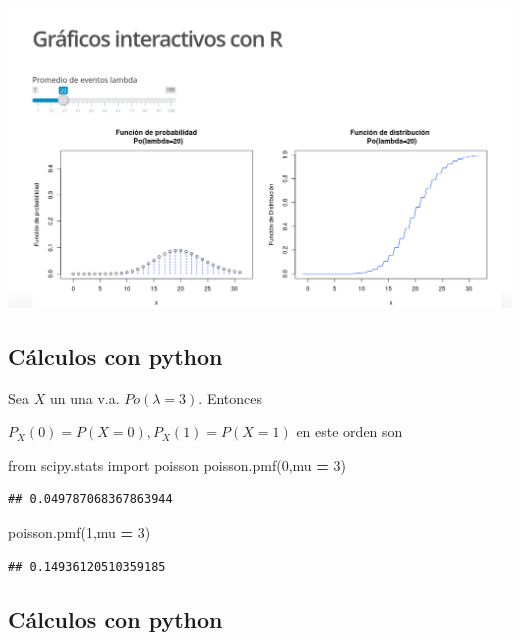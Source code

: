 \documentclass[]{book}
\newenvironment{Shaded}{\begin{snugshade}}{\end{snugshade}}
\newcommand{\DecValTok}[1]{\textcolor[rgb]{0.00,0.00,0.81}{#1}}
\newcommand{\ImportTok}[1]{#1}
\newcommand{\NormalTok}[1]{#1}
\newcommand{\OperatorTok}[1]{\textcolor[rgb]{0.81,0.36,0.00}{\textbf{#1}}}
\begin{document}
\href{https://joanby.shinyapps.io/DistribucionesNotables/}{\includegraphics{Images/noshinyImages/interactiva_poisson2.png}}

\hypertarget{cuxe1lculos-con-python-6}{%
\subsection{Cálculos con python}\label{cuxe1lculos-con-python-6}}

Sea \(X\) un una v.a. \(Po(\lambda=3)\). Entonces

\(P_X(0)=P(X=0), P_X(1)=P(X=1)\) en este orden son

\begin{Shaded}
\begin{Highlighting}[]
\ImportTok{from}\NormalTok{ scipy.stats }\ImportTok{import}\NormalTok{ poisson}
\NormalTok{poisson.pmf(}\DecValTok{0}\NormalTok{,mu }\OperatorTok{=} \DecValTok{3}\NormalTok{)}
\end{Highlighting}
\end{Shaded}

\begin{verbatim}
## 0.049787068367863944
\end{verbatim}

\begin{Shaded}
\begin{Highlighting}[]
\NormalTok{poisson.pmf(}\DecValTok{1}\NormalTok{,mu }\OperatorTok{=} \DecValTok{3}\NormalTok{)}
\end{Highlighting}
\end{Shaded}

\begin{verbatim}
## 0.14936120510359185
\end{verbatim}

\hypertarget{cuxe1lculos-con-python-7}{%
\subsection{Cálculos con python}\label{cuxe1lculos-con-python-7}}
\end{document}
